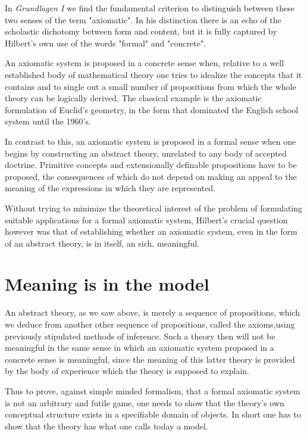 \documentclass[12pt]{article}
\begin{document}
In \emph{Grundlagen I} we find the fundamental criterion to distinguish between these two senses of the term "axiomatic". In his distinction there is an echo of the scholastic dichotomy between form and content, but it is fully  captured by Hilbert's own use of the words "formal" and "concrete".

An axiomatic system is proposed in a concrete sense when, relative to a well established body of mathematical theory  one tries to idealize the concepts that it contains and to single out a small number of propositions from which the whole theory can be logically derived. The classical example is the axiomatic formulation of Euclid's geometry, in the form that dominated the English school system until the 1960's.

In contrast to this, an axiomatic system is proposed in a formal sense when one begins by constructing an abstract theory, unrelated to any body of accepted doctrine. Primitive concepts and extensionally definable propositions have to be proposed, the consequences of which do not depend on making an appeal to the meaning of the expressions in which they are represented.

Without trying to minimize the theoretical interest of the problem of formulating suitable applications for a formal axiomatic system, Hilbert's crucial question however was that of establishing whether an axiomatic system, even in the form of  an abstract theory, is in itself, an sich, meaningful.

\section{Meaning is in the model}\normalsize

An abstract theory, as we saw above, is merely a sequence of propositions, which we deduce from another other sequence of propositions, called the axioms,using previously stipulated methods of inference. Such a theory then will not be meaningful in the same sense in which an axiomatic system proposed in a concrete sense is meaningful, since the meaning of this  latter theory is provided by the body of experience which the theory is supposed to explain.

Thus to prove, against simple minded formalism, that a formal axiomatic system is not an arbitrary and futile game, one needs to show that the theory's own conceptual structure exists in a specifiable domain of objects. In short one has to show that the theory has what one calls today a model.
\end{document}
